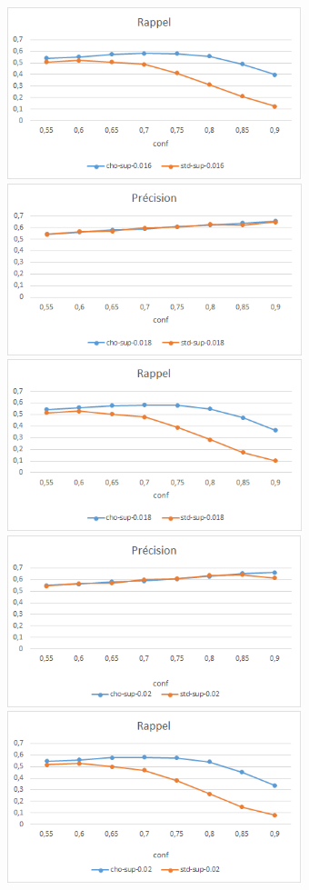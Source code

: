 \documentclass[a4paper,12pt,openany,oneside]{article}
\begin{document}
\includegraphics[height=5cm]{s0-016r.png}
\medskip
\includegraphics[height=5cm]{s0-018.png}
\includegraphics[height=5cm]{s0-018r.png}
\medskip
\includegraphics[height=5cm]{s0-02.png}
\includegraphics[height=5cm]{s0-02r.png}
\end{document}
